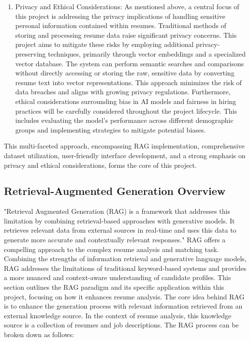 \documentclass[12pt]{report}
\begin{document}
\begin{enumerate}
    \item Privacy and Ethical Considerations: As mentioned above, a central focus of this project is addressing the privacy implications of handling sensitive personal information contained within resumes. Traditional methods of storing and processing resume data raise significant privacy concerns. This project aims to mitigate these risks by employing additional privacy-preserving techniques, primarily through vector embeddings and a specialized vector database. The system can perform semantic searches and comparisons without directly accessing or storing the raw, sensitive data by converting resume text into vector representations. This approach minimizes the risk of data breaches and aligns with growing privacy regulations. Furthermore, ethical considerations surrounding bias in AI models and fairness in hiring practices will be carefully considered throughout the project lifecycle. This includes evaluating the model's performance across different demographic groups and implementing strategies to mitigate potential biases.

\end{enumerate}
    This multi-faceted approach, encompassing RAG implementation, comprehensive dataset utilization, user-friendly interface development, and a strong emphasis on privacy and ethical considerations, forms the core of this project. 

\subsection{Retrieval-Augmented Generation Overview}
"Retrieval Augmented Generation (RAG) is a framework that addresses this limitation by combining retrieval-based approaches with generative models. It retrieves relevant data from external sources in real-time and uses this data to generate more accurate and contextually relevant responses." \cite{rothman-2024}
RAG offers a compelling approach to the complex resume analysis and matching task. Combining the strengths of information retrieval and generative language models, RAG addresses the limitations of traditional keyword-based systems and provides a more nuanced and context-aware understanding of candidate profiles. This section outlines the RAG paradigm and its specific application within this project, focusing on how it enhances resume analysis. \cite{rothman-2024}
The core idea behind RAG is to enhance the generation process with relevant information retrieved from an external knowledge source. In the context of resume analysis, this knowledge source is a collection of resumes and job descriptions. The RAG process can be broken down as follows:
\end{document}
